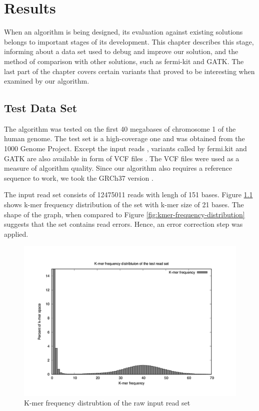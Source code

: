 \chapter{Results}
\label{chap:results}

When an algorithm is being designed, its evaluation against existing solutions belongs to important stages of its development. This chapter describes this stage, informing about a data set used to debug and improve our solution, and the method of comparison with other solutions, such as fermi-kit and GATK. The last part of the chapter covers certain variants that proved to be interesting when examined by our algorithm.

\section{Test Data Set}
\label{sec:test-data-set}

The algorithm was tested on the first 40 megabases of chromosome 1 of the human genome. The test set is a high-coverage one and was obtained from the 1000 Genome Project. Except the input reads \cite{testreads}, variants called by fermi.kit and GATK are also available in form of VCF files \cite{testvcf}. The VCF files were used as a measure of algorithm quality. Since our algorithm also requires a reference sequence to work, we took the GRCh37 version \cite{testref}.

The input read set consists of 12475011 reads with lengh of 151 bases. Figure \ref{fig:test-kmer-frequency-distribution} shows k-mer frequency distribution of the set with k-mer size of 21 bases. The shape of the graph, when compared to Figure \ref{fig:kmer-frequency-distribution} suggests that the set contains read errors. Hence, an error correction step was applied.

\begin{figure}[h]
	\centering
	\includegraphics{img/test-kmer-frequency-distribution.pdf}
	\caption{K-mer frequency distrubtion of the raw input read set}
	\label{fig:test-kmer-frequency-distribution}
\end{figure}


